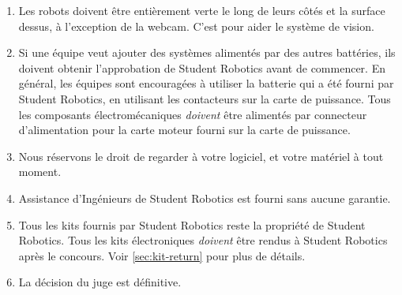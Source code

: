\begin{enumerate}
\item Les robots doivent être entièrement verte le long de leurs côtés et la surface dessus, à l'exception de la webcam. 
 C'est pour aider le système de vision.
\item Si une équipe veut ajouter des systèmes alimentés par des autres battéries, ils doivent obtenir l'approbation de Student Robotics avant de commencer.
 En général, les équipes sont encouragées à utiliser la batterie qui a été fourni par Student Robotics, en utilisant les contacteurs sur la carte de puissance.
 Tous les composants électromécaniques \emph{doivent} être alimentés par connecteur d'alimentation pour la carte moteur fourni sur la carte de puissance.
\item Nous réservons le droit de regarder à votre logiciel, et votre matériel à tout moment.
\item Assistance d'Ingénieurs de Student Robotics est fourni sans aucune garantie.
\item Tous les kits fournis par Student Robotics reste la propriété de Student Robotics.
 Tous les kits électroniques \emph{doivent} être rendus à Student Robotics après le concours. Voir \autoref{sec:kit-return} pour plus de détails.
\item La décision du juge est définitive.


\end{enumerate}
